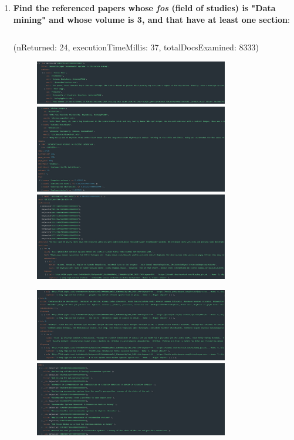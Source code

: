 \documentclass{Configuration_Files/PoliMi3i_thesis}
\begin{document}
\begin{enumerate}
    \item \textbf{Find the referenced papers whose \textit{fos} (field of studies) is "Data mining" and whose volume is 3, and that have at least one section}:
    \inputminted[linenos,tabsize=2,breaklines]{MQL}{code/queries_mongodb/query_10.txt}
    (nReturned: 24, executionTimeMillis: 37, totalDocsExamined: 8333)
    \begin{figure}[H]
        \centering
        \includegraphics[width=0.8\textwidth]{Images/queries_mongodb/query_10_1.jpg}
         \includegraphics[width=0.8\textwidth]{Images/queries_mongodb/query_10_2.jpg}    
         \includegraphics[width=0.8\textwidth]{Images/queries_mongodb/query_10_3.jpg}
     \end{figure}
     \begin{figure}[H]
        \centering
        \includegraphics[width=0.8\textwidth]{Images/queries_mongodb/query_10_4.jpg}
        \includegraphics[width=0.8\textwidth]{Images/queries_mongodb/query_10_5.jpg}
    \end{figure}
    

\end{enumerate}
\end{document}
